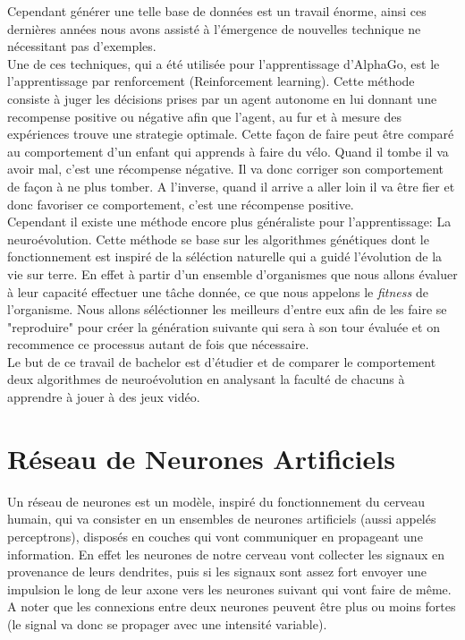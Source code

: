 \documentclass{article}
\begin{document}
Cependant générer une telle base de données est un travail énorme, ainsi ces dernières années nous avons assisté à l'émergence de nouvelles technique ne nécessitant pas d'exemples.\\

Une de ces techniques, qui a été utilisée pour l'apprentissage d'AlphaGo\cite{alphago}, est le l'apprentissage par renforcement (Reinforcement learning). Cette méthode consiste à juger les décisions prises par un agent autonome en lui donnant une recompense positive ou négative afin que l'agent, au fur et à mesure des expériences trouve une strategie optimale.\cite{wikirl} Cette façon de faire peut être comparé au comportement d'un enfant qui apprends à faire du vélo. Quand il tombe il va avoir mal, c'est une récompense négative. Il va donc corriger son comportement de façon à ne plus tomber. A l'inverse, quand il arrive a aller loin il va être fier et donc favoriser ce comportement, c'est une récompense positive.\\

Cependant il existe une méthode encore plus généraliste pour l'apprentissage: La neuroévolution. Cette méthode se base sur les algorithmes génétiques dont le fonctionnement est inspiré de la séléction naturelle qui a guidé l'évolution de la vie sur terre. En effet à partir d'un ensemble d'organismes que nous allons évaluer à leur capacité effectuer une tâche donnée, ce que nous appelons le \textit{fitness} de l'organisme. Nous allons séléctionner les meilleurs d'entre eux afin de les faire se "reproduire" pour créer la génération suivante qui sera à son tour évaluée et on recommence ce processus autant de fois que nécessaire.\cite{wikineuroevolution}\\

Le but de ce travail de bachelor est d'étudier et de comparer le comportement deux algorithmes de neuroévolution en analysant la faculté de chacuns à apprendre à jouer à des jeux vidéo.\\

\section{Réseau de Neurones Artificiels}

Un réseau de neurones est un modèle, inspiré du fonctionnement du cerveau humain, qui va consister en un ensembles de neurones artificiels (aussi appelés perceptrons), disposés en couches qui vont communiquer en propageant une information.\cite{wikiann} En effet les neurones de notre cerveau vont collecter les signaux en provenance de leurs dendrites, puis si les signaux sont assez fort envoyer une impulsion le long de leur axone vers les neurones suivant qui vont faire de même. A noter que les connexions entre deux neurones peuvent être plus ou moins fortes (le signal va donc se propager avec une intensité variable).\cite{neuronswork}
\end{document}
